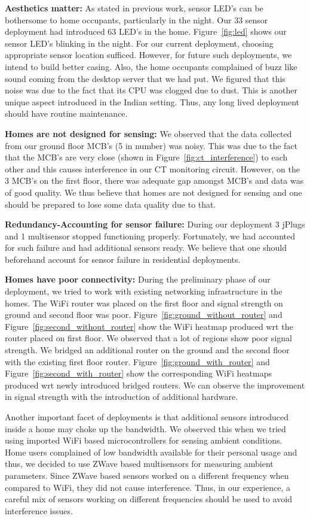 \documentclass[10pt]{sensys-proc}
\newcommand{\figref}[1]{Figure~\ref{#1}}
\begin{document}
\noindent \textbf{Aesthetics matter:} As stated in previous work, sensor LED's can be bothersome to home occupants, particularly in the night. Our 33 sensor deployment had introduced 63 LED's in the home. \figref{fig:led} shows our sensor LED's blinking in the night. For our current deployment, choosing appropriate sensor location sufficed. However, for future such deployments, we intend to build better casing. Also, the home occupants complained of buzz like sound coming from the desktop server that we had put. We figured that this noise was due to the fact that its CPU was clogged due to dust. This is another unique aspect introduced in the Indian setting. Thus, any long lived deployment should have routine maintenance.

\noindent \textbf{Homes are not designed for sensing:} We observed that the data collected from our ground floor MCB's (5 in number) was noisy. This was due to the fact that the MCB's are very close (shown in \figref{fig:ct_interference}) to each other and this causes interference in our CT monitoring circuit. However, on the 3 MCB's on the first floor, there was adequate gap amongst MCB's and data was of good quality. We thus believe that homes are not designed for sensing and one should be prepared to lose some data quality due to that.

\noindent \textbf{Redundancy-Accounting for sensor failure:} During our deployment 3 jPlugs and 1 multisensor stopped functioning properly. Fortunately, we had accounted for such failure and had additional sensors ready. We believe that one should beforehand  account for sensor failure in residential deployments.

\noindent \textbf{Homes have poor connectivity:} During the preliminary phase of our deployment, we tried to work with existing networking infrastructure in the homes. The WiFi router was placed on the first floor and signal strength on ground and second floor was poor. \figref{fig:ground_without_router} and \figref{fig:second_without_router} show the WiFi heatmap produced wrt the router placed on first floor. We observed that a lot of regions show poor signal strength. We bridged an additional router on the ground and the second floor with the existing first floor router. \figref{fig:ground_with_router} and \figref{fig:second_with_router} show the corresponding WiFi heatmaps produced wrt newly introduced bridged routers. We can observe the improvement in signal strength with the introduction of additional hardware. 

\noindent Another important facet of deployments is that additional sensors introduced inside a home may choke up the bandwidth. We observed this when we tried using imported WiFi based microcontrollers for sensing ambient conditions. Home users complained of low bandwidth available for their personal usage and thus, we decided to use ZWave based multisensors for measuring ambient parameters. Since ZWave based sensors worked on a different frequency when compared to WiFi, they did not cause interference. Thus, in our experience, a careful mix of sensors working on different frequencies should be used to avoid interference issues.
\end{document}
